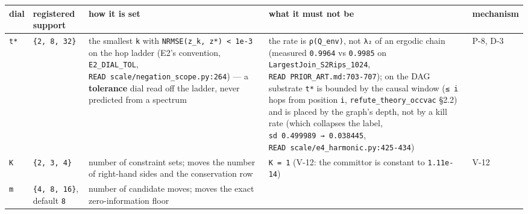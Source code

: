 \documentclass[11pt,a4paper]{article}
\newcounter{none}                 %
\theoremstyle{plain}
\theoremstyle{definition}
\theoremstyle{remark}
\begin{document}
{\def\LTcaptype{none} %
\begin{longtable}[]{@{}
  >{\raggedright\arraybackslash}p{}
  >{\raggedright\arraybackslash}p{}
  >{\raggedright\arraybackslash}p{}
  >{\raggedright\arraybackslash}p{}
  >{\raggedright\arraybackslash}p{}@{}}
\toprule\noalign{}
\begin{minipage}[b]{\linewidth}\raggedright
dial
\end{minipage} & \begin{minipage}[b]{\linewidth}\raggedright
registered support
\end{minipage} & \begin{minipage}[b]{\linewidth}\raggedright
how it is set
\end{minipage} & \begin{minipage}[b]{\linewidth}\raggedright
what it must not be
\end{minipage} & \begin{minipage}[b]{\linewidth}\raggedright
mechanism
\end{minipage} \\
\midrule\noalign{}
\endhead
\bottomrule\noalign{}
\endlastfoot
\texttt{t*} & \texttt{\{2,\ 8,\ 32\}} & the smallest \texttt{k} with
\texttt{NRMSE(z\_k,\ z*)\ \textless{}\ 1e-3} on the hop ladder (E2's
convention, \texttt{E2\_DIAL\_TOL},
\texttt{READ\ scale/negation\_scope.py:264}) --- a \textbf{tolerance}
dial read off the ladder, never predicted from a spectrum & the rate is
\texttt{ρ(Q\_env)}, not \texttt{λ₂} of an ergodic chain (measured
\texttt{0.9964} vs \texttt{0.9985} on
\texttt{LargestJoin\_S2Rips\_1024},
\texttt{READ\ PRIOR\_ART.md:703-707}); on the DAG substrate \texttt{t*}
is bounded by the causal window (\texttt{≤\ i} hops from position
\texttt{i}, \texttt{refute\_theory\_occvac} §2.2) and is placed by the
graph's depth, not by a kill rate (which collapses the label,
\texttt{sd\ 0.499989\ →\ 0.038445},
\texttt{READ\ scale/e4\_harmonic.py:425-434}) & P-8, D-3 \\
\texttt{K} & \texttt{\{2,\ 3,\ 4\}} & number of constraint sets; moves
the number of right-hand sides and the conservation row &
\texttt{K\ =\ 1} (V-12: the committor is constant to \texttt{1.11e-14})
& V-12 \\
\texttt{m} & \texttt{\{4,\ 8,\ 16\}}, default \texttt{8} & number of
candidate moves; moves the exact zero-information floor

\end{longtable}}
\end{document}
